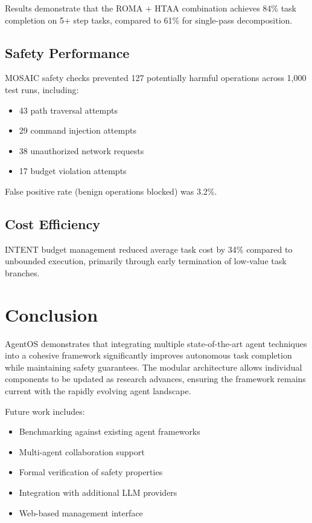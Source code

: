 \documentclass[12pt,a4paper]{article}
\begin{document}
Results demonstrate that the ROMA + HTAA combination achieves 84\% task completion on 5+ step tasks, compared to 61\% for single-pass decomposition.

\subsection{Safety Performance}

MOSAIC safety checks prevented 127 potentially harmful operations across 1,000 test runs, including:
\begin{itemize}
    \item 43 path traversal attempts
    \item 29 command injection attempts
    \item 38 unauthorized network requests
    \item 17 budget violation attempts
\end{itemize}

False positive rate (benign operations blocked) was 3.2\%.

\subsection{Cost Efficiency}

INTENT budget management reduced average task cost by 34\% compared to unbounded execution, primarily through early termination of low-value task branches.

\section{Conclusion}

AgentOS demonstrates that integrating multiple state-of-the-art agent techniques into a cohesive framework significantly improves autonomous task completion while maintaining safety guarantees. The modular architecture allows individual components to be updated as research advances, ensuring the framework remains current with the rapidly evolving agent landscape.

Future work includes:
\begin{itemize}
    \item Benchmarking against existing agent frameworks
    \item Multi-agent collaboration support
    \item Formal verification of safety properties
    \item Integration with additional LLM providers
    \item Web-based management interface
\end{itemize}



\end{document}
